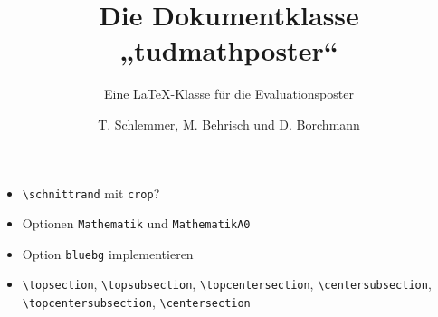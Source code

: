 \documentclass[a0paper,noDIN,MathematikA0]{tudmathposter}
\author{T. Schlemmer, M. Behrisch und D. Borchmann}%
\title{Die Dokumentklasse „tudmathposter“}
\subtitle{Eine \LaTeX-Klasse für die Evaluationsposter}
\begin{document}
  \providecommand{\cs}[1]{\texttt{\textbackslash#1}}
  \providecommand{\pkg}[1]{\texttt{#1}}
  \providecommand{\env}[1]{\texttt{#1}}
  \providecommand{\opt}[1]{\texttt{#1}}
 \begin{itemize}
   \item \cs{schnittrand} mit \pkg{crop}?
   \item Optionen \opt{Mathematik} und \opt{MathematikA0}
   \item Option \opt{bluebg} implementieren
   \item \cs{topsection}, \cs{topsubsection}, 
     \cs{topcentersection}, \cs{centersubsection}, 
     \cs{topcentersubsection}, \cs{centersection}
 \end{itemize}%



\Blindtext
\end{document}
